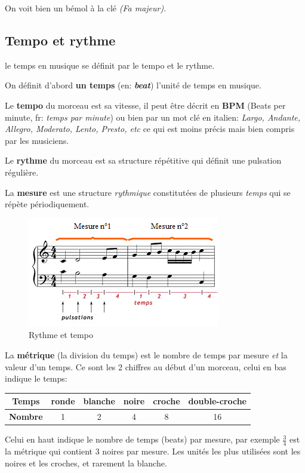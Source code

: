 \documentclass[]{article}
\begin{document}
On voit bien un bémol à la clé \emph{(Fa majeur)}.

\hypertarget{tempo-et-rythme}{%
\subsection{Tempo et rythme}\label{tempo-et-rythme}}

le temps en musique se définit par le tempo et le rythme.

On définit d'abord \textbf{un temps} (en: \textbf{\emph{beat}}) l'unité
de temps en musique.

Le \textbf{tempo} du morceau est sa vitesse, il peut être décrit en
\textbf{BPM} (Beats per minute, fr: \emph{temps par minute}) ou bien par
un mot clé en italien: \emph{Largo, Andante, Allegro, Moderato, Lento,
Presto, etc} ce qui est moins précis mais bien compris par les
musiciens.

Le \textbf{rythme} du morceau est sa structure répétitive qui définit
une pulsation régulière.

La \textbf{mesure} est une structure \emph{rythmique} constitutées de
plusieurs \emph{temps} qui se répète périodiquement.

\begin{figure}
\centering
\includegraphics{img/rythme.png}
\caption{Rythme et tempo}
\end{figure}

La \textbf{métrique} (la division du temps) est le nombre de temps par
mesure \emph{et} la valeur d'un temps. Ce sont les 2 chiffres au début
d'un morceau, celui en bas indique le temps:

\begin{longtable}[]{@{}cccccc@{}}
\toprule
\textbf{Temps} & ronde & blanche & noire & croche &
double-croche\tabularnewline
\midrule
\endhead
\textbf{Nombre} & 1 & 2 & 4 & 8 & 16\tabularnewline
\bottomrule
\end{longtable}

Celui en haut indique le nombre de temps (beats) par mesure, par exemple
\(\frac{3}{4}\) est la métrique qui contient 3 noires par mesure. Les
unités les plus utilisées sont les noires et les croches, et rarement la
blanche.
\end{document}
